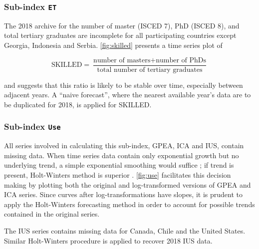 \documentclass[a4paper,11pt,UKenglish,twoside,openright]{report}\usepackage[]{graphicx}\usepackage[]{color}
\begin{document}


\subsubsection{Sub-index \texttt{ET}}

The 2018 archive for the number of master (ISCED 7), PhD (ISCED 8), and total tertiary graduates are incomplete for all participating countries except Georgia, Indonesia and Serbia. \cref{fig:skilled} presents a time series plot of

\[ \text{SKILLED} = \frac{\text{number of masters} + \text{number of PhDs}}{\text{total number of tertiary graduates}} \]

%
and suggests that this ratio is likely to be stable over time, especially between adjacent years. A ``naive forecast'', where the nearest available year's data are to be duplicated for 2018, is applied for SKILLED.

\subsubsection{Sub-index \texttt{Use}}

All series involved in calculating this sub-index, GPEA, ICA and IUS, contain missing data. When time series data contain only exponential growth but no underlying trend, a simple exponential smoothing would suffice \parencite{garder:1985}; if trend is present, Holt-Winters method is superior \parencite{chatfield:1978}. \cref{fig:use} facilitates this decision making by plotting both the original and log-transformed versions of GPEA and ICA series. Since curves after log-transformations have slopes, it is prudent to apply the Holt-Winters forecasting method in order to account for possible trends contained in the original series.


The IUS series contains missing data for Canada, Chile and the United States. Similar Holt-Winters procedure is applied to recover 2018 IUS data.
\end{document}
